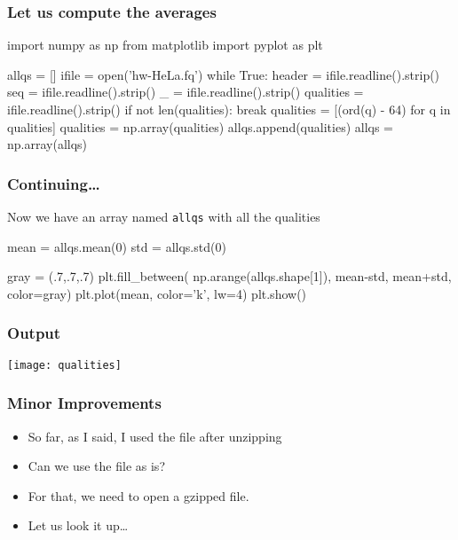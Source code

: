 \begin{frame}[fragile]
\frametitle{Let us compute the averages}

\begin{python}
import numpy as np
from matplotlib import pyplot as plt

allqs = []
ifile = open('hw-HeLa.fq')
while True:
    header = ifile.readline().strip()
    seq = ifile.readline().strip()
    _ = ifile.readline().strip()
    qualities = ifile.readline().strip()
    if not len(qualities):
        break
    qualities = [(ord(q) - 64) for q in qualities]
    qualities = np.array(qualities)
    allqs.append(qualities)
allqs = np.array(allqs)
\end{python}
\end{frame}

\begin{frame}[fragile]
\frametitle{Continuing\ldots}

Now we have an array named \lstinline{allqs} with all the qualities

\begin{python}
mean = allqs.mean(0)
std = allqs.std(0)
\end{python}

\pause

\begin{python}
gray = (.7,.7,.7)
plt.fill_between(
    np.arange(allqs.shape[1]),
    mean-std,
    mean+std,
    color=gray)
plt.plot(mean, color='k', lw=4)
plt.show()
\end{python}

\end{frame}


\begin{frame}[fragile]
\frametitle{Output}

\centering
\texttt{[image: qualities]}

\end{frame}

\begin{frame}[fragile]
\frametitle{Minor Improvements}

\begin{itemize}
\item So far, as I said, I used the file after unzipping
\item Can we use the file \alert{as is}?
\item For that, we need to open a gzipped file.
\item Let us look it up\ldots
\end{itemize}

\end{frame}

